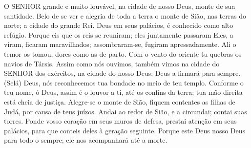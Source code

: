 {\PP 
  O SENHOR
{} grande e muito louvável, na cidade de nosso Deus,
{} monte de sua santidade.
  Belo de se ver e alegria de toda a terra
{} o monte de Sião, nas terras do norte; a cidade do grande Rei.
  Deus
{} em seus palácios,
{} é conhecido como alto refúgio.
  Porque eis que os reis se reuniram; eles juntamente passaram
  Eles,
{} a viram, ficaram maravilhados; assombraram-se, fugiram apressadamente.
  Ali o temor os tomou,
{} dores como as de parto.
  Com o vento do oriente tu quebras os navios de Társis.
  Assim como nós ouvimos, também vimos na cidade do SENHOR dos exércitos, na cidade do nosso Deus; Deus a firmará para sempre. (Selá)
  Deus, nós reconhecemos tua bondade no meio de teu templo.
  Conforme o teu nome, ó Deus, assim é o louvor a ti, até os confins da terra; tua mão direita está cheia de justiça.
  Alegre-se o monte de Sião, fiquem contentes as filhas de Judá, por causa de teus juízos.
  Andai ao redor de Sião, e a circundai; contai suas torres.
  Ponde vosso coração em seus muros de defesa, prestai atenção em seus palácios, para que conteis deles à geração seguinte.
  Porque este Deus
{} nosso Deus para todo o sempre; ele nos acompanhará até a morte.
\par }


